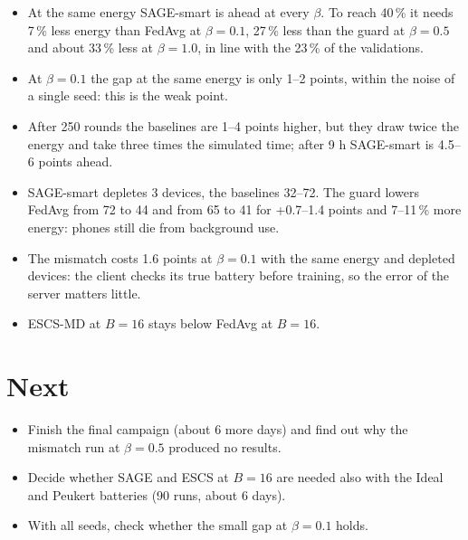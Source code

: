 \documentclass[10pt,a4paper]{article}
\begin{document}
\begin{itemize}
  \item At the same energy SAGE-smart is ahead at every $\beta$. To reach
        40\,\% it needs 7\,\% less energy than FedAvg at $\beta = 0.1$, 27\,\%
        less than the guard at $\beta = 0.5$ and about 33\,\% less at $\beta =
        1.0$, in line with the 23\,\% of the validations.
  \item At $\beta = 0.1$ the gap at the same energy is only 1--2 points, within
        the noise of a single seed: this is the weak point.
  \item After 250 rounds the baselines are 1--4 points higher, but they draw
        twice the energy and take three times the simulated time; after 9 h
        SAGE-smart is 4.5--6 points ahead.
  \item SAGE-smart depletes 3 devices, the baselines 32--72. The guard lowers
        FedAvg from 72 to 44 and from 65 to 41 for +0.7--1.4 points and
        7--11\,\% more energy: phones still die from background use.
  \item The mismatch costs 1.6 points at $\beta = 0.1$ with the same energy and
        depleted devices: the client checks its true battery before training,
        so the error of the server matters little.
  \item ESCS-MD at $B = 16$ stays below FedAvg at $B = 16$.
\end{itemize}

\section{Next}
\label{sec:next}

\begin{itemize}
  \item Finish the final campaign (about 6 more days) and find out why the
        mismatch run at $\beta = 0.5$ produced no results.
  \item Decide whether SAGE and ESCS at $B = 16$ are needed also with the Ideal
        and Peukert batteries (90 runs, about 6 days).
  \item With all seeds, check whether the small gap at $\beta = 0.1$ holds.
\end{itemize}
\end{document}
